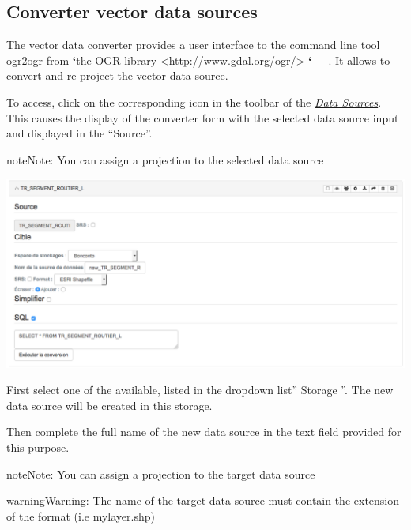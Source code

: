 \documentclass[letterpaper,10pt,english]{sphinxmanual}
\begin{document}
\subsection{Converter vector data sources}
\label{data/processing:convertisseur-de-sources-de-donnees-vectorielles}
The vector data converter provides a user interface to the command line tool  \href{http://www.gdal.org/ogr2ogr.html}{ogr2ogr} from  {\color{red}\bfseries{}{}`}the OGR library \textless{}\href{http://www.gdal.org/ogr/}{http://www.gdal.org/ogr/}\textgreater{} {\color{red}\bfseries{}{}`}\_\_. It allows to convert and re-project the vector data source.

To access, click on the corresponding icon in the toolbar of the {\hyperref[data/datasources::doc]{\emph{\emph{Data Sources}}}}. This causes the display of the converter form with the selected data source input and displayed in the ``Source''.

\begin{notice}{note}{Note:}
You can assign a projection to the selected data source
\end{notice}

\includegraphics[width=1.000\linewidth]{vector-converter-window.png}

First select one of the  available, listed in the dropdown list'' Storage ''. The new data source will be created in this storage.

Then complete the full name of the new data source in the text field provided for this purpose.

\begin{notice}{note}{Note:}
You can assign a projection to the target data source
\end{notice}

\begin{notice}{warning}{Warning:}
The name of the target data source must contain the extension of the format (i.e mylayer.shp)
\end{notice}
\end{document}
